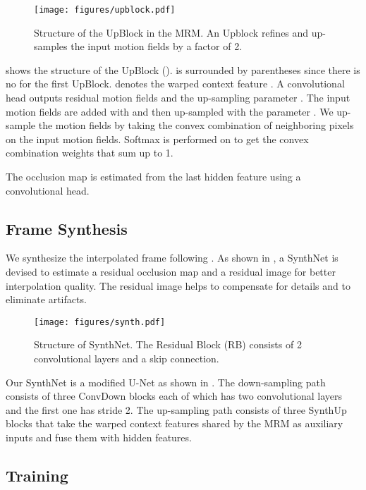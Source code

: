 \documentclass{article}
\begin{document}
\begin{figure}[hbtp]
    \centering
    \texttt{[image: figures/upblock.pdf]}
    \caption{Structure of the UpBlock in the MRM. An Upblock refines and up-samples the input motion fields by a factor of 2.}
    \label{fig:upblock}
\end{figure}

 shows the structure of the  UpBlock ().  is surrounded by parentheses since there is no  for the first UpBlock.  denotes the warped context feature  . A convolutional head outputs residual motion fields  and the up-sampling parameter . The input motion fields are added with  and then up-sampled with the parameter . We up-sample the motion fields by taking the convex combination of neighboring  pixels on the input motion fields. Softmax is performed on  to get the convex combination weights that sum up to 1. 

The occlusion map  is estimated from the last hidden feature  using a convolutional head.

\subsection{Frame Synthesis}

We synthesize the interpolated frame following . As shown in , a SynthNet is devised to estimate a residual occlusion map  and a residual image  for better interpolation quality. The residual image helps to compensate for details and to eliminate artifacts.

\begin{figure}[h]
    \centering
    \texttt{[image: figures/synth.pdf]}
    \caption{Structure of SynthNet. The Residual Block (RB) consists of 2 convolutional layers and a skip connection.}
    \label{fig:synth}
\end{figure}

Our SynthNet is a modified U-Net as shown in . The down-sampling path consists of three ConvDown blocks each of which has two convolutional layers and the first one has stride 2. The up-sampling path consists of three SynthUp blocks that take the warped context features shared by the MRM as auxiliary inputs and fuse them with hidden features.

\subsection{Training}
\end{document}
